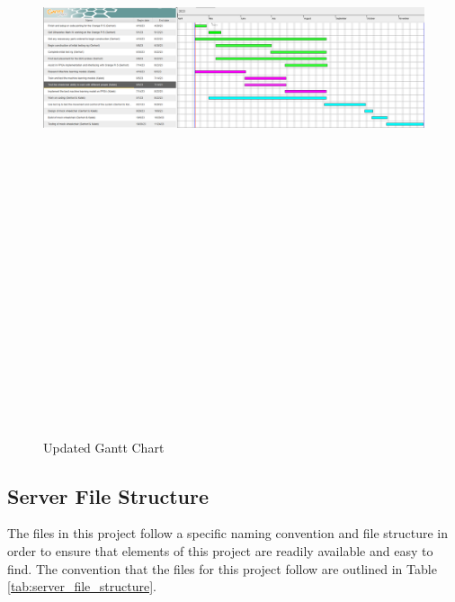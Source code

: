 \documentclass[conference]{IEEEtran}
\begin{document}
    \onecolumn
    \begin{figure}
        \centering
        \centerline{\includegraphics[angle=90,height=8.5in, keepaspectratio]{figs/E/updated_gantt.png}}
        \caption{Updated Gantt Chart}
        \label{fig:updated_gantt}
    \end{figure}
    \twocolumn

    \subsection{Server File Structure}
    The files in this project follow a specific naming convention and file structure in order to ensure that elements of this project are readily available and easy to find. The convention that the files for this project follow are outlined in Table \ref{tab:server_file_structure}.
    
\end{document}
